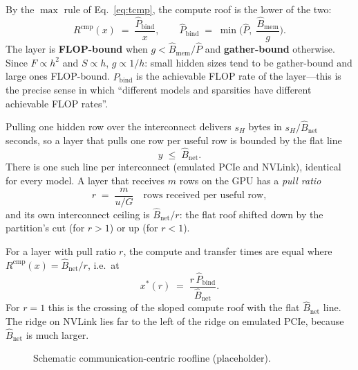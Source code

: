 By the $\max$ rule of Eq.~\eqref{eq:tcmp}, the compute roof is the lower of the two:
\begin{equation}
  R^{\mathrm{cmp}}(x) \;=\; \frac{\hat{P}_{\mathrm{bind}}}{x},
  \qquad
  \hat{P}_{\mathrm{bind}} \;=\; \min\!\Big(\hat{P},\; \frac{\hat{B}_{\mathrm{mem}}}{g}\Big).
  \label{eq:roof-cmp}
\end{equation}
The layer is \textbf{FLOP-bound} when $g < \hat{B}_{\mathrm{mem}}/\hat{P}$ and
\textbf{gather-bound} otherwise. Since $F \propto h^2$ and $S \propto h$, $g \propto 1/h$:
small hidden sizes tend to be gather-bound and large ones FLOP-bound. $\hat{P}_{\mathrm{bind}}$
is the achievable FLOP rate of the layer---this is the precise sense in which ``different models
and sparsities have different achievable FLOP rates''.

Pulling one hidden row over the interconnect delivers $s_H$ bytes in $s_H/\hat{B}_{\mathrm{net}}$
seconds, so a layer that pulls one row per useful row is bounded by the flat line
\begin{equation}
  y \;\le\; \hat{B}_{\mathrm{net}}.
  \label{eq:roof-net}
\end{equation}
There is one such line per interconnect (emulated PCIe and NVLink), identical for every model.
A layer that receives $m$ rows on the GPU has a \emph{pull ratio}
\begin{equation}
  r \;=\; \frac{m}{u/G} \quad\text{rows received per useful row},
  \label{eq:pull-ratio}
\end{equation}
and its own interconnect ceiling is $\hat{B}_{\mathrm{net}}/r$: the flat roof shifted down by the
partition's cut (for $r>1$) or up (for $r<1$).

For a layer with pull ratio $r$, the compute and transfer times are equal where
$R^{\mathrm{cmp}}(x) = \hat{B}_{\mathrm{net}}/r$, i.e.\ at
\begin{equation}
  x^{*}(r) \;=\; \frac{r\,\hat{P}_{\mathrm{bind}}}{\hat{B}_{\mathrm{net}}}.
  \label{eq:ridge}
\end{equation}
For $r{=}1$ this is the crossing of the sloped compute roof with the flat $\hat{B}_{\mathrm{net}}$
line. The ridge on NVLink lies far to the left of the ridge on emulated PCIe, because
$\hat{B}_{\mathrm{net}}$ is much larger.

\begin{figure}[h]
  \centering
  \caption{Schematic communication-centric roofline (placeholder).}
  \label{fig:cm-schematic}
\end{figure}

